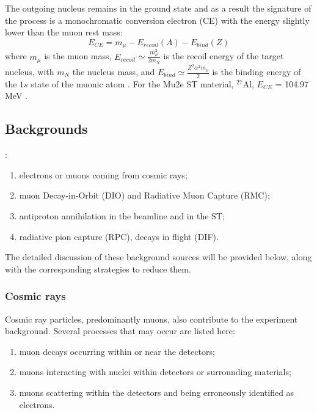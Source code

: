 The outgoing nucleus 
remains in the ground state and as a result the signature of the process is a monochromatic conversion electron 
(CE) with the energy slightly lower than the muon rest mass:
\begin{equation}
    E_{CE} = m_\mu - E_{recoil}(A) - E_{bind}(Z) 
\end{equation}
where $m_\mu$ is the muon mass, $E_{recoil}\simeq \frac{m^2_\mu}{2 m_N}$ is 
the recoil energy of the target nucleus, with $m_N$ the nucleus mass, and 
$E_{bind}\simeq \frac{Z^2 \alpha^2 m_\mu}{2}$ is the binding energy of the 
$1s$ state of the muonic atom \cite{universe9010054}. For the Mu2e 
ST material, $^{27}$Al, $E_{CE}$ = 104.97 MeV \cite{PhysRevD.84.013006}.

\subsection{Backgrounds}\label{backgrounds}

 \cite{bartoszek2015mu2e}:
\begin{enumerate}
\item electrons or muons coming from cosmic rays;
\item muon Decay-in-Orbit (DIO) and Radiative Muon Capture (RMC);
\item antiproton annihilation in the beamline and in the ST;
  \item radiative pion capture (RPC), decays in flight (DIF).
\end{enumerate}
  
The detailed discussion of these background sources will be provided below, along with the 
corresponding strategies to reduce  
them. 
\subsubsection{Cosmic rays}
Cosmic ray particles, predominantly muons, also contribute to the experiment 
background. Several processes that may occur are listed here:
\begin{enumerate}
    \item muon decays occurring within or near the detectors;
    \item muons interacting with nuclei within detectors or surrounding materials;
    \item muons scattering within the detectors and being erroneously identified as electrons.
    
\end{enumerate}

